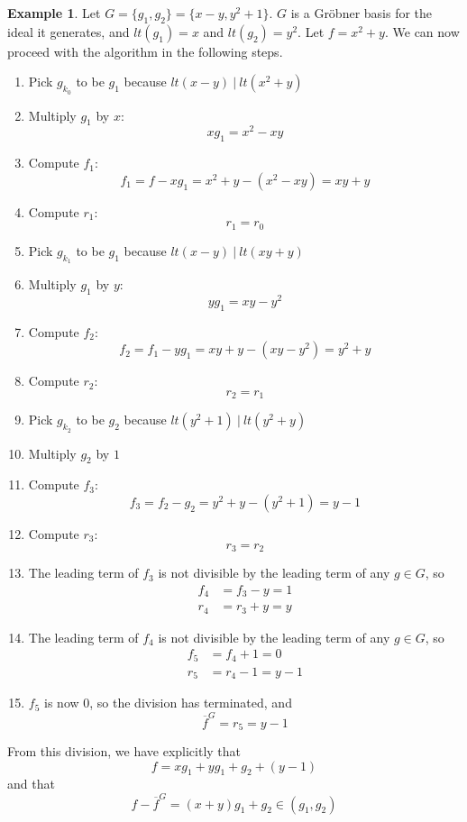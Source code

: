 \documentclass{msthesis}
\theoremstyle{definition}
\newtheorem{example}[theorem]{Example}
\begin{document}
\begin{example}
Let $G = \{g_1,g_2\} = \{x - y, y^2 + 1\}$.  $G$ is a Gr\"obner basis for the ideal it generates, and $lt(g_1) = x$ and $lt(g_2) = y^2$.  Let $f = x^2 + y$.  We can now proceed with the algorithm in the following steps.

\begin{enumerate}[nosep]
    \item Pick $g_{k_0}$ to be $g_1$ because $lt(x-y)\ |\ lt(x^2+y)$
    \item Multiply $g_{1}$ by $x$: \[ xg_{1} = x^2 - xy \]
    \item Compute $f_1$:
    \[ f_1 = f - xg_{1} = x^2 + y - (x^2 - xy) = xy + y\]
    \item Compute $r_1$:
        \[ r_1 = r_0 \]
    \item Pick $g_{k_1}$ to be $g_1$ because $lt(x - y)\ |\ lt(xy + y)$
    \item Multiply $g_{1}$ by $y$: \[ yg_{1} = xy - y^2 \]
    \item Compute $f_2$:
    \[ f_2 = f_1 - yg_{1} = xy + y - (xy - y^2) = y^2 + y \]
    \item Compute $r_2$:
        \[ r_2 = r_1 \]
    \item Pick $g_{k_2}$ to be $g_2$ because $lt(y^2 + 1)\ |\ lt(y^2 + y)$
    \item Multiply $g_{2}$ by $1$
    \item Compute $f_3$:
    \[ f_3 = f_2 - g_{2} = y^2 + y - (y^2 + 1) = y - 1 \]
    \item Compute $r_3$:
        \[ r_3 = r_2 \]
    \item The leading term of $f_3$ is not divisible by the leading term of any $g \in G$, so
    \begin{align*}
        f_4 &= f_3 - y = 1 \\
        r_4 &= r_3 + y = y
    \end{align*}
    \item The leading term of $f_4$ is not divisible by the leading term of any $g \in G$, so
    \begin{align*}
        f_5 &= f_4 + 1 = 0 \\
        r_5 &= r_4 - 1 = y - 1
    \end{align*}
    \item $f_5$ is now $0$, so the division has terminated, and
    \[ \overline{f}^G = r_5 = y - 1 \]
\end{enumerate}

From this division, we have explicitly that
\[ f = xg_1 + yg_1 + g_2 + (y - 1)\]
and that
\[ f - \overline{f}^G = (x+y)g_1 + g_2 \in (g_1, g_2) \]
\end{example}
\end{document}
